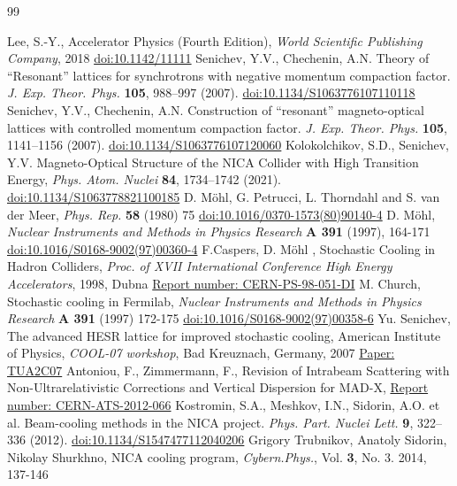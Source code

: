\documentclass[submitting]{nst}
\begin{document}
\begin{thebibliography} {99}

	Lee, S.-Y., Accelerator Physics (Fourth Edition), {\it World Scientific Publishing Company}, 2018 \href{https://doi.org/10.1142/11111}{doi:10.1142/11111}
	Senichev, Y.V., Chechenin, A.N. Theory of “Resonant” lattices for synchrotrons with negative momentum compaction factor. {\it J. Exp. Theor. Phys.} {\bf 105}, 988–997 (2007). \href{https://doi.org/10.1134/S1063776107110118}{doi:10.1134/S1063776107110118}
	Senichev, Y.V., Chechenin, A.N. Construction of “resonant” magneto-optical lattices with controlled momentum compaction factor. {\it J. Exp. Theor. Phys.} {\bf 105}, 1141–1156 (2007). \href{https://doi.org/10.1134/S1063776107120060}{doi:10.1134/S1063776107120060}
	Kolokolchikov, S.D., Senichev, Y.V. Magneto-Optical Structure of the NICA Collider with High Transition Energy, {\it Phys. Atom. Nuclei} {\bf 84}, 1734–1742 (2021). \href{https://doi.org/10.1134/S1063778821100185}{doi:10.1134/S1063778821100185}
	D. Möhl, G. Petrucci, L. Thorndahl and S. van der Meer, {\it Phys. Rep.} {\bf 58} (1980) 75 \href{https://doi.org/10.1016/0370-1573(80)90140-4}{doi:10.1016/0370-1573(80)90140-4}
	D. Möhl, {\it Nuclear Instruments and Methods in Physics Research} {\bf A 391} (1997), 164-171 \href{https://doi.org/10.1016/S0168-9002(97)00360-4}{doi:10.1016/S0168-9002(97)00360-4}
	F.Caspers, D. Möhl , Stochastic Cooling in Hadron Colliders, {\it Proc. of XVII International Conference High Energy Accelerators}, 1998, Dubna \href{https://inspirehep.net/literature/920888}{Report number: CERN-PS-98-051-DI}
	M. Church, Stochastic cooling in Fermilab, {\it Nuclear Instruments and Methods in Physics Research} {\bf A 391} (1997) 172-175 \href{https://doi.org/10.1016/S0168-9002(97)00358-6}{doi:10.1016/S0168-9002(97)00358-6}
	Yu. Senichev, The advanced HESR lattice for improved stochastic cooling, American Institute of Physics, {\it COOL-07 workshop}, Bad Kreuznach, Germany, 2007 \href{https://accelconf.web.cern.ch/cl07/TALKS/TUA2C07_TALK.PDF}{Paper: TUA2C07}
	Antoniou, F., Zimmermann, F., Revision of Intrabeam Scattering with Non-Ultrarelativistic Corrections and Vertical Dispersion for MAD-X, \href{https://inspirehep.net/literature/708833}{Report number: CERN-ATS-2012-066}
	Kostromin, S.A., Meshkov, I.N., Sidorin, A.O. et al. Beam-cooling methods in the NICA project. {\it Phys. Part. Nuclei Lett.} {\bf 9}, 322–336 (2012). \href{https://doi.org/10.1134/S1547477112040206}{doi:10.1134/S1547477112040206}
	Grigory Trubnikov, Anatoly Sidorin, Nikolay Shurkhno, NICA cooling program, {\it Cybern.Phys.}, Vol. {\bf 3}, No. 3. 2014, 137-146



\end{thebibliography}
\end{document}
